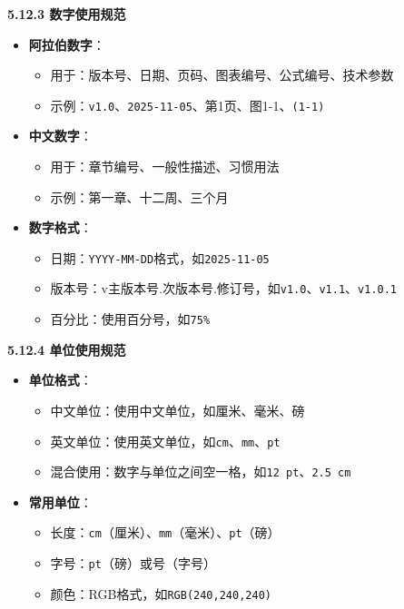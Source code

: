 \documentclass[12pt,a4paper]{article}
\numberwithin{equation}{section}  %
\begin{document}
\textbf{5.12.3 数字使用规范}

\begin{itemize}
\item \textbf{阿拉伯数字}：
\begin{itemize}
\item 用于：版本号、日期、页码、图表编号、公式编号、技术参数
\item 示例：\texttt{v1.0}、\texttt{2025-11-05}、{\ttfamily 第1页}、{\ttfamily 图1-1}、\texttt{(1-1)}

\end{itemize}
\item \textbf{中文数字}：
\begin{itemize}
\item 用于：章节编号、一般性描述、习惯用法
\item 示例：{\ttfamily 第一章}、{\ttfamily 十二周}、{\ttfamily 三个月}

\end{itemize}
\item \textbf{数字格式}：
\begin{itemize}
\item 日期：\texttt{YYYY-MM-DD}格式，如\texttt{2025-11-05}
\item 版本号：{\ttfamily v主版本号.次版本号.修订号}，如\texttt{v1.0}、\texttt{v1.1}、\texttt{v1.0.1}
\item 百分比：使用百分号，如\texttt{75\%}
\end{itemize}
\end{itemize}

\textbf{5.12.4 单位使用规范}

\begin{itemize}
\item \textbf{单位格式}：
\begin{itemize}
\item 中文单位：使用中文单位，如{\ttfamily 厘米}、{\ttfamily 毫米}、{\ttfamily 磅}
\item 英文单位：使用英文单位，如\texttt{cm}、\texttt{mm}、\texttt{pt}
\item 混合使用：数字与单位之间空一格，如\texttt{12 pt}、\texttt{2.5 cm}

\end{itemize}
\item \textbf{常用单位}：
\begin{itemize}
\item 长度：\texttt{cm}（厘米）、\texttt{mm}（毫米）、\texttt{pt}（磅）
\item 字号：\texttt{pt}（磅）或{\ttfamily 号}（字号）
\item 颜色：RGB格式，如\texttt{RGB(240,240,240)}
\end{itemize}
\end{itemize}
\end{document}
